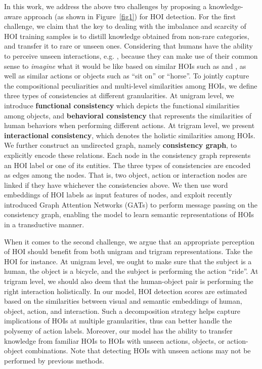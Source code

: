 \documentclass[sigconf,screen]{acmart}
\begin{document}
In this work, we address the above two challenges by proposing a knowledge-aware approach (as shown in Figure~\ref{fig1}) for HOI detection. For the first challenge, we claim that the key to dealing with the imbalance and scarcity of HOI training samples is to distill knowledge obtained from non-rare categories, and transfer it to rare or unseen ones. Considering that humans have the ability to perceive unseen interactions, e.g. , because they can make use of their common sense to \textit{imagine} what it would be like based on similar HOIs such as  and , as well as similar actions or objects such as ``sit on'' or ``horse''. To jointly capture the compositional peculiarities and multi-level similarities among HOIs, we define three types of consistencies at different granularities. At unigram level, we introduce \textbf{functional consistency} which depicts the functional similarities among objects, and \textbf{behavioral consistency} that represents the similarities of human behaviors when performing different actions. At trigram level, we present \textbf{interactional consistency}, which denotes the holistic similarities among HOIs. We further construct an undirected graph, namely \textbf{consistency graph}, to explicitly encode these relations. Each node in the consistency graph represents an HOI label or one of its entities. The three types of consistencies are encoded as edges among the nodes. That is, two object, action or interaction nodes are linked if they have whichever the consistencies above. We then use word embeddings of HOI labels as input features of nodes, and exploit recently introduced Graph Attention Networks (GATs) \cite{velickovic2018graph} to perform message passing on the consistency graph, enabling the model to learn semantic representations of HOIs in a transductive manner.

When it comes to the second challenge, we argue that an appropriate perception of HOI should benefit from both unigram and trigram representations. Take the HOI  for instance. At unigram level, we ought to make sure that the subject is a human, the object is a bicycle, and the subject is performing the action ``ride''. At trigram level, we should also deem that the human-object pair is performing the right interaction holistically. In our model, HOI detection scores are estimated based on the similarities between visual and semantic embeddings of human, object, action, and interaction. Such a decomposition strategy helps capture implications of HOIs at multiple granularities, thus can better handle the polysemy of action labels. Moreover, our model has the ability to transfer knowledge from familiar HOIs to HOIs with unseen actions, objects, or action-object combinations. Note that detecting HOIs with unseen actions may not be performed by previous methods.
\end{document}
